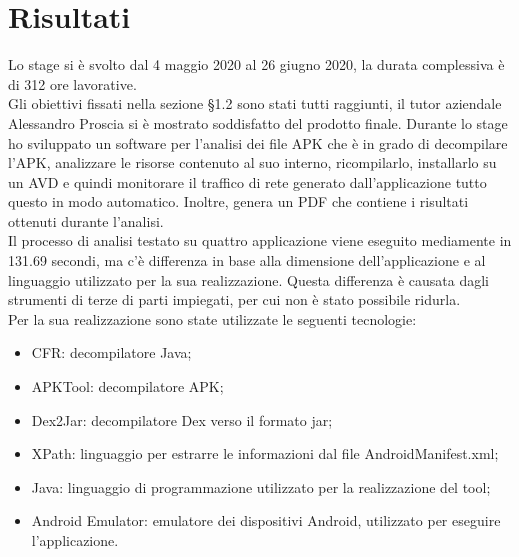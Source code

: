 \section{Risultati}\label{sec:risultati}
Lo stage si è svolto dal 4 maggio 2020 al 26 giugno 2020, la durata complessiva è di 312 ore lavorative.\\
Gli obiettivi fissati nella sezione \S1.2 sono stati tutti raggiunti, il tutor aziendale Alessandro Proscia si è mostrato soddisfatto del prodotto finale.
Durante lo stage ho sviluppato un software per l'analisi dei file APK che è in grado di decompilare l'APK, analizzare le risorse contenuto al suo interno, ricompilarlo, installarlo su un AVD e quindi monitorare il traffico di rete generato dall'applicazione tutto questo in modo automatico.
Inoltre, genera un PDF che contiene i risultati ottenuti durante l'analisi.\\
Il processo di analisi testato su quattro applicazione viene eseguito mediamente in 131.69 secondi, ma c'è differenza in base alla dimensione dell'applicazione e al linguaggio utilizzato per la sua realizzazione.
Questa differenza è causata dagli strumenti di terze di parti impiegati, per cui non è stato possibile ridurla.
\\
Per la sua realizzazione sono state utilizzate le seguenti tecnologie:
\begin{itemize}
    \item CFR: decompilatore Java;
    \item APKTool: decompilatore APK;
    \item Dex2Jar: decompilatore Dex verso il formato jar;
    \item XPath: linguaggio per estrarre le informazioni dal file AndroidManifest.xml;
    \item Java: linguaggio di programmazione utilizzato per la realizzazione del tool;
    \item Android Emulator: emulatore dei dispositivi Android, utilizzato per eseguire l'applicazione.
\end{itemize}
